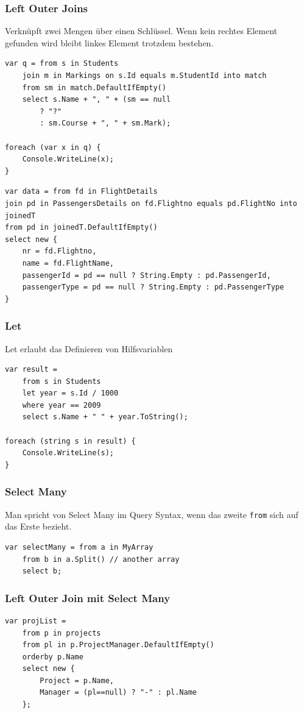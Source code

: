 \documentclass[
a4paper,
oneside,
10pt,
fleqn,
headsepline,
toc=listofnumbered, 
bibliography=totocnumbered]{scrartcl}
\begin{document}
\subsubsection{Left Outer Joins}
Verknüpft zwei Mengen über einen Schlüssel. Wenn kein rechtes Element gefunden wird bleibt linkes Element trotzdem bestehen.
\begin{lstlisting}
var q = from s in Students
	join m in Markings on s.Id equals m.StudentId into match
	from sm in match.DefaultIfEmpty()
	select s.Name + ", " + (sm == null
		? "?"
		: sm.Course + ", " + sm.Mark);
		
foreach (var x in q) {
	Console.WriteLine(x);
}
\end{lstlisting}

\begin{lstlisting}
var data = from fd in FlightDetails
join pd in PassengersDetails on fd.Flightno equals pd.FlightNo into joinedT
from pd in joinedT.DefaultIfEmpty()
select new {
	nr = fd.Flightno,
	name = fd.FlightName,
	passengerId = pd == null ? String.Empty : pd.PassengerId,
	passengerType = pd == null ? String.Empty : pd.PassengerType
}
\end{lstlisting}

\clearpage

\subsubsection{Let}
Let erlaubt das Definieren von Hilfsvariablen
\begin{lstlisting}
var result =
	from s in Students
	let year = s.Id / 1000
	where year == 2009
	select s.Name + " " + year.ToString();

foreach (string s in result) {
	Console.WriteLine(s);
}
\end{lstlisting}


\subsubsection{Select Many}
Man spricht von Select Many im Query Syntax, wenn das zweite \lstinline|from| sich auf das Erste bezieht.
\begin{lstlisting}
var selectMany = from a in MyArray
	from b in a.Split() // another array
	select b;
\end{lstlisting}

\subsubsection{Left Outer Join mit Select Many}
\begin{lstlisting}
var projList = 
	from p in projects
	from pl in p.ProjectManager.DefaultIfEmpty()
	orderby p.Name
	select new { 
		Project = p.Name,
		Manager = (pl==null) ? "-" : pl.Name 
	};
\end{lstlisting}
\end{document}
